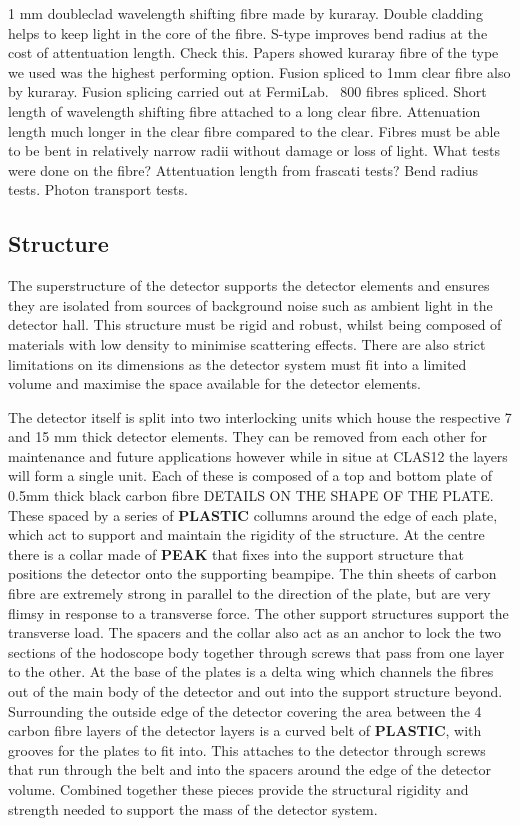 1 mm doubleclad wavelength shifting fibre made by kuraray.
Double cladding helps to keep light in the core of the fibre.
S-type improves bend radius at the cost of attentuation length. Check this.
Papers showed kuraray fibre of the type we used was the highest performing option.
Fusion spliced to 1mm clear fibre also by kuraray.
Fusion splicing carried out at FermiLab.
~800 fibres spliced.
Short length of wavelength shifting fibre attached to a long clear fibre. Attenuation length much longer in the clear fibre compared to the clear.
Fibres must be able to be bent in relatively narrow radii without damage or loss of light. 
What tests were done on the fibre?
Attentuation length from frascati tests?
Bend radius tests.
Photon transport tests.

\cite{dyshkant2006quality}
\subsection{Structure}

The superstructure of the detector supports the detector elements and ensures they are isolated from sources of background noise such as ambient light in the detector hall. This structure must be rigid and robust, whilst being composed of materials with low density to minimise scattering effects. There are also strict limitations on its dimensions as the detector system must fit into a limited volume and maximise the space available for the detector elements.

The detector itself is split into two interlocking units which house the respective 7 and 15 mm thick detector elements. They can be removed from each other for maintenance and future applications however while in situe at CLAS12 the layers will form a single unit. Each of these is composed of a top and bottom plate of 0.5mm thick black carbon fibre DETAILS ON THE SHAPE OF THE PLATE. These spaced by a series of \textbf{PLASTIC} collumns around the edge of each plate, which act to support and maintain the rigidity of the structure. At the centre there is a collar made of \textbf{PEAK} that fixes into the support structure that positions the detector onto the supporting beampipe. The thin sheets of carbon fibre are extremely strong in parallel to the direction of the plate, but are very flimsy in response to a transverse force. The other support structures support the transverse load. The spacers and the collar also act as an anchor to lock the two sections of the hodoscope body together through screws that pass from one layer to the other. At the base of the plates is a delta wing which channels the fibres out of the main body of the detector and out into the support structure beyond. Surrounding the outside edge of the detector covering the area between the 4 carbon fibre layers of the detector layers is a curved belt of \textbf{PLASTIC}, with grooves for the plates to fit into. This attaches to the detector through screws that run through the belt and into the spacers around the edge of the detector volume. Combined together these pieces provide the structural rigidity and strength needed to support the mass of the detector system.

